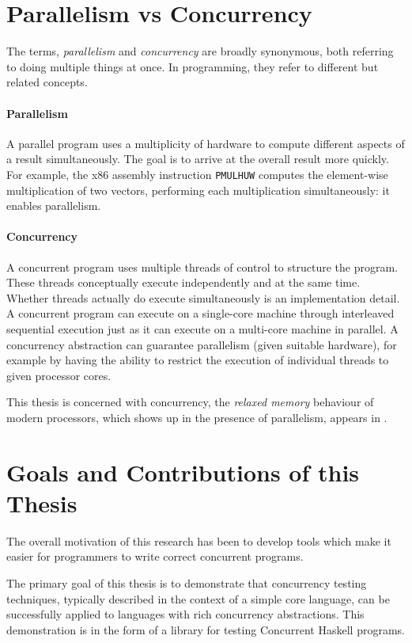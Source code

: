 \section{Parallelism vs Concurrency}
\label{sec:intro-parconc}

The terms, \emph{parallelism} and \emph{concurrency} are broadly
synonymous, both referring to doing multiple things at once.  In
programming, they refer to different but related concepts.

\paragraph{Parallelism}
A parallel program uses a multiplicity of hardware to compute
different aspects of a result simultaneously.  The goal is to arrive
at the overall result more quickly.  For example, the x86 assembly
instruction \verb#PMULHUW# computes the element-wise multiplication of
two vectors, performing each multiplication simultaneously: it enables
parallelism.

\paragraph{Concurrency}
A concurrent program uses multiple threads of control to
structure the program.  These threads conceptually execute
independently and at the same time.  Whether threads actually do execute
simultaneously is an implementation detail.  A concurrent program can
execute on a single-core machine through interleaved sequential
execution just as it can execute on a multi-core machine in parallel.
A concurrency abstraction can guarantee parallelism (given suitable
hardware), for example by having the ability to restrict the execution
of individual threads to given processor cores.

This thesis is concerned with concurrency, the \emph{relaxed memory}
behaviour of modern processors, which shows up in the presence of
parallelism, appears in .

\section{Goals and Contributions of this Thesis}
\label{sec:intro-contributions}

The overall motivation of this research has been to develop tools
which make it easier for programmers to write correct concurrent
programs.

The primary goal of this thesis is to demonstrate that concurrency
testing techniques, typically described in the context of a simple
core language, can be successfully applied to languages with rich
concurrency abstractions.  This demonstration is in the form of a
library for testing Concurrent Haskell programs.

